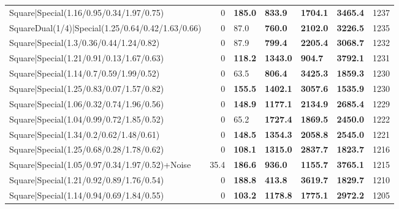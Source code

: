 \begin{tabular}{lrllllr}
 Square|Special(1.16/0.95/0.34/1.97/0.75)                      &             0   & \textbf{185.0} & \textbf{833.9}  & \textbf{1704.1} & \textbf{3465.4} &         1237 \\
 SquareDual(1/4)|Special(1.25/0.64/0.42/1.63/0.66)             &             0   & 87.0           & \textbf{760.0}  & \textbf{2102.0} & \textbf{3226.5} &         1235 \\
 Square|Special(1.3/0.36/0.44/1.24/0.82)                       &             0   & 87.9           & \textbf{799.4}  & \textbf{2205.4} & \textbf{3068.7} &         1232 \\
 Square|Special(1.21/0.91/0.13/1.67/0.63)                      &             0   & \textbf{118.2} & \textbf{1343.0} & \textbf{904.7}  & \textbf{3792.1} &         1231 \\
 Square|Special(1.14/0.7/0.59/1.99/0.52)                       &             0   & 63.5           & \textbf{806.4}  & \textbf{3425.3} & \textbf{1859.3} &         1230 \\
 Square|Special(1.25/0.83/0.07/1.57/0.82)                      &             0   & \textbf{155.5} & \textbf{1402.1} & \textbf{3057.6} & \textbf{1535.9} &         1230 \\
 Square|Special(1.06/0.32/0.74/1.96/0.56)                      &             0   & \textbf{148.9} & \textbf{1177.1} & \textbf{2134.9} & \textbf{2685.4} &         1229 \\
 Square|Special(1.04/0.99/0.72/1.85/0.52)                      &             0   & 65.2           & \textbf{1727.4} & \textbf{1869.5} & \textbf{2450.0} &         1222 \\
 Square|Special(1.34/0.2/0.62/1.48/0.61)                       &             0   & \textbf{148.5} & \textbf{1354.3} & \textbf{2058.8} & \textbf{2545.0} &         1221 \\
 Square|Special(1.25/0.68/0.28/1.78/0.62)                      &             0   & \textbf{108.1} & \textbf{1315.0} & \textbf{2837.7} & \textbf{1823.7} &         1216 \\
 Square|Special(1.05/0.97/0.34/1.97/0.52)+Noise                &            35.4 & \textbf{186.6} & \textbf{936.0}  & \textbf{1155.7} & \textbf{3765.1} &         1215 \\
 Square|Special(1.21/0.92/0.89/1.76/0.54)                      &             0   & \textbf{188.8} & \textbf{413.8}  & \textbf{3619.7} & \textbf{1829.7} &         1210 \\
 Square|Special(1.14/0.94/0.69/1.84/0.55)                      &             0   & \textbf{103.2} & \textbf{1178.8} & \textbf{1775.1} & \textbf{2972.2} &         1205 \\

\end{tabular}
